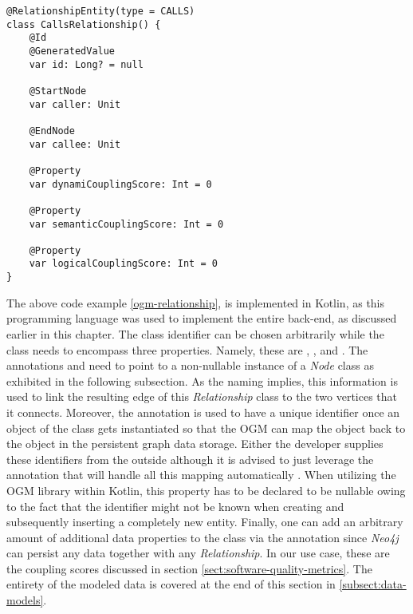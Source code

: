 \documentclass[12pt,a4paper]{report}
\begin{document}
\smaller
\begin{lstlisting}[caption=Relationship OGM class, label=ogm-relationship, breaklines=true]
@RelationshipEntity(type = CALLS)
class CallsRelationship() {
    @Id
    @GeneratedValue
    var id: Long? = null

    @StartNode
    var caller: Unit

    @EndNode
    var callee: Unit

    @Property
    var dynamiCouplingScore: Int = 0

    @Property
    var semanticCouplingScore: Int = 0

    @Property
    var logicalCouplingScore: Int = 0
}
\end{lstlisting}
\normalsize

The above code example \ref{ogm-relationship}, is implemented in Kotlin,
as this programming language was used to implement the entire back-end,
as discussed earlier in this chapter.
The class identifier can be chosen arbitrarily while the class needs to
encompass three properties.
Namely, these are , , and .
The annotations  and  need to point
to a non-nullable instance of a \textit{Node} class as exhibited in the
following subsection. As the naming implies, this information is used
to link the resulting edge of this \textit{Relationship} class to the
two vertices that it connects.
Moreover, the  annotation is used to have a unique identifier
once an object of the class gets instantiated so that the OGM can map
the object back to the object in the persistent graph data storage.
Either the developer supplies these identifiers from the outside although
it is advised to just leverage the  annotation that
will handle all this mapping automatically \cite{neo4j-ogm}.
When utilizing the OGM library within Kotlin, this property has to be
declared to be nullable owing to the fact that the identifier might not
be known when creating and subsequently inserting a completely new entity.
Finally, one can add an arbitrary amount of additional data properties
to the class via the  annotation since \textit{Neo4j} can persist
any data together with any \textit{Relationship}. In our use case,
these are the coupling scores discussed in section \ref{sect:software-quality-metrics}.
The entirety of the modeled data is covered at the end of this section in
\ref{subsect:data-models}.
\end{document}
